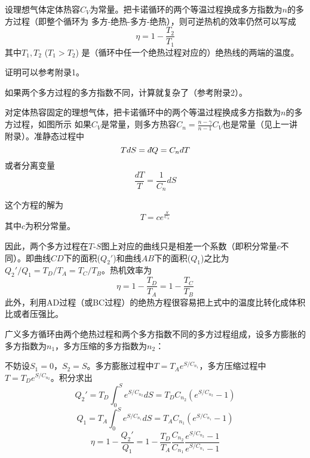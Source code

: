 \documentclass[CJK]{beamer}
\begin{document}
\begin{frame}
\bchL
设理想气体定体热容$C_V$为常量。把卡诺循环的两个等温过程换成多方指数为$n$的多方过程（即整个循环为 多方-绝热-多方-绝热），则可逆热机的效率仍然可以写成
{\blue $$\eta = 1-\frac{T_2}{T_1}$$}
其中$T_1, T_2$ ($T_1>T_2$) 是（循环中任一个绝热过程对应的）绝热线的两端的温度。

\skipline

      {\scriptsize 证明可以参考附录1。

        如果两个多方过程的多方指数不同，计算就复杂了（参考附录2）。}
\echL
\end{frame}


\begin{frame}
\bch
{}
对定体热容固定的理想气体，把卡诺循环中的两个等温过程换成多方指数为$n$的多方过程，如图所示
\emini
{}
\emini
如果$C_V$是常量，则多方热容$C_n =\frac{n-\gamma}{n-1}C_V$也是常量（见上一讲附录）。准静态过程中
$$ TdS = \dbar Q  = C_n dT $$
或者分离变量
$$\frac{dT}{T} = \frac{1}{C_n} dS$$
\ech
\end{frame}


\begin{frame}
\bch
{}
这个方程的解为
$$T =  c e^{\frac{S}{C_n} }$$
其中$c$为积分常量。
\emini
{}
\emini

因此，两个多方过程在$T$-$S$图上对应的曲线只是相差一个系数（即积分常量$c$不同）。即曲线$CD$下的面积($Q_2'$)和曲线$AB$下的面积($Q_1$)之比为$Q_2'/Q_1=T_D/T_A = T_C/T_B$。热机效率为
$$ \eta = 1 - \frac{T_D}{T_A} = 1 - \frac{T_C}{T_B}$$
{\scriptsize 此外，利用AD过程（或BC过程）的绝热方程很容易把上式中的温度比转化成体积比或者压强比。}

\ech
\end{frame}

\begin{frame}
\bch
{}
广义多方循环由两个绝热过程和两个多方指数不同的多方过程组成，设多方膨胀的多方指数为$n_1$，多方压缩的多方指数为$n_2$：
\emini
{}
\emini

{\scriptsize 
不妨设$S_1=0$，$S_2=S$。多方膨胀过程中$T = T_A e^{S/C_{n_1}}$，多方压缩过程中$T= T_D e^{S/C_{n_2}}$。积分求出
$$Q_2' = T_D \int_0^S e^{S/C_{n_2}} dS = T_DC_{n_2}\left(e^{S/C_{n_2}}-1\right)$$
$$Q_1  = T_A \int_0^S e^{S/C_{n_1}} dS = T_AC_{n_1}\left(e^{S/C_{n_1}}-1\right)$$
$$\eta = 1-\frac{Q_2'}{Q_1} = 1 - \frac{T_D}{T_A} \frac{C_{n_2}}{C_{n_1}} \frac{e^{S/C_{n_2}}-1}{e^{S/C_{n_1}}-1}$$
}
\ech
\end{frame}
\end{document}
